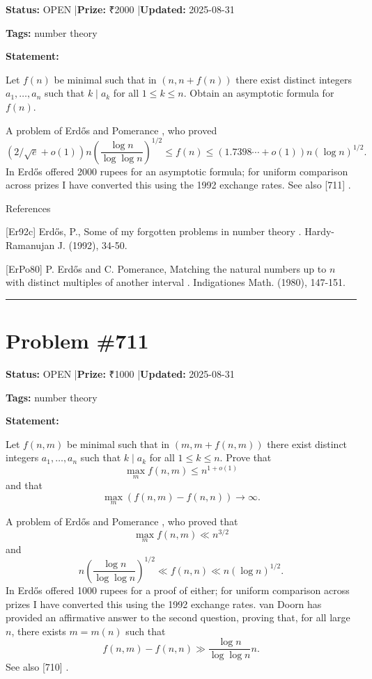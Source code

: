 \documentclass{article}
\begin{document}
\noindent\textbf{Status:} OPEN \quad|\quad \textbf{Prize:} ₹2000 \quad|\quad \textbf{Updated:} 2025-08-31

\noindent\textbf{Tags:} number theory

\medskip

\noindent\textbf{Statement:}

Let $f(n)$ be minimal such that in $(n,n+f(n))$ there exist distinct integers $a_1,\ldots,a_n$ such that $k\mid a_k$ for all $1\leq k\leq n$. Obtain an asymptotic formula for $f(n)$.




A problem of Erd\H{o}s and Pomerance \cite{ErPo80}, who proved\[(2/\sqrt{e}+o(1))n\left(\frac{\log n}{\log\log n}\right)^{1/2}\leq f(n)\leq (1.7398\cdots+o(1))n(\log n)^{1/2}.\]In \cite{Er92c} Erd\H{o}s offered 2000 rupees for an asymptotic formula; for uniform comparison across prizes I have converted this using the 1992 exchange rates. See also [711] .




References

[Er92c] Erd\H{o}s, P., Some of my forgotten problems in number theory . Hardy-Ramanujan J. (1992), 34-50.

[ErPo80] P. Erd\H{o}s and C. Pomerance, Matching the natural numbers up to $n$ with distinct multiples of another interval . Indigationes Math. (1980), 147-151.

\noindent\rule{\linewidth}{0.4pt}


\section{Problem \#711}
\label{prob:711}

\noindent\textbf{Status:} OPEN \quad|\quad \textbf{Prize:} ₹1000 \quad|\quad \textbf{Updated:} 2025-08-31

\noindent\textbf{Tags:} number theory

\medskip

\noindent\textbf{Statement:}

Let $f(n,m)$ be minimal such that in $(m,m+f(n,m))$ there exist distinct integers $a_1,\ldots,a_n$ such that $k\mid a_k$ for all $1\leq k\leq n$. Prove that\[\max_m f(n,m) \leq n^{1+o(1)}\]and that\[\max_m (f(n,m)-f(n,n))\to \infty.\]




A problem of Erd\H{o}s and Pomerance \cite{ErPo80}, who proved that\[\max_m f(n,m) \ll n^{3/2}\]and\[n\left(\frac{\log n}{\log\log n}\right)^{1/2} \ll f(n,n)\ll n(\log n)^{1/2}.\]In \cite{Er92c} Erd\H{o}s offered 1000 rupees for a proof of either; for uniform comparison across prizes I have converted this using the 1992 exchange rates. van Doorn \cite{vD26} has provided an affirmative answer to the second question, proving that, for all large $n$, there exists $m=m(n)$ such that\[f(n,m)-f(n,n) \gg \frac{\log n}{\log\log n}n.\]See also [710] .
\end{document}
